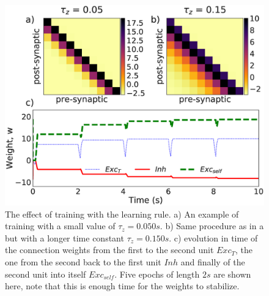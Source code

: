 \documentclass[10pt, a4paper]{article}
\begin{document}
\begin{figure}[H]
\centering
\includegraphics[scale=0.3]{training_rule.eps}
\caption{The effect of training with the learning rule. a) An example of training with a small value of $\tau_z=0.050s$. b) Same procedure as in a but with a longer time constant $\tau_z=0.150s$. c) evolution in time of the connection weights from the first to the second unit $Exc_T$, the one from the second back to the first unit $Inh$ and finally of the second unit into itself $Exc_{self}$. Five epochs of length $2s$ are shown here, note that this is enough time for the weights to stabilize.}\label{Fig:epochs}
\end{figure}

%

%
%
%

\end{document}
